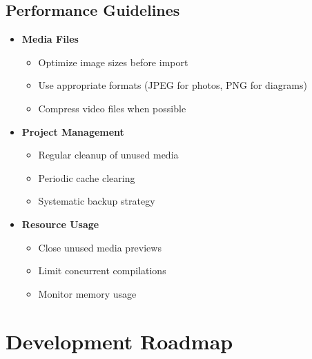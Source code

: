 \documentclass[11pt,a4paper]{article}
\begin{document}
\subsection{Performance Guidelines}
\begin{tcolorbox}[title=Optimization Recommendations]
\begin{itemize}
    \item \textbf{Media Files}
        \begin{itemize}
            \item Optimize image sizes before import
            \item Use appropriate formats (JPEG for photos, PNG for diagrams)
            \item Compress video files when possible
        \end{itemize}
    \item \textbf{Project Management}
        \begin{itemize}
            \item Regular cleanup of unused media
            \item Periodic cache clearing
            \item Systematic backup strategy
        \end{itemize}
    \item \textbf{Resource Usage}
        \begin{itemize}
            \item Close unused media previews
            \item Limit concurrent compilations
            \item Monitor memory usage
        \end{itemize}
\end{itemize}
\end{tcolorbox}

\section{Development Roadmap}
\end{document}
